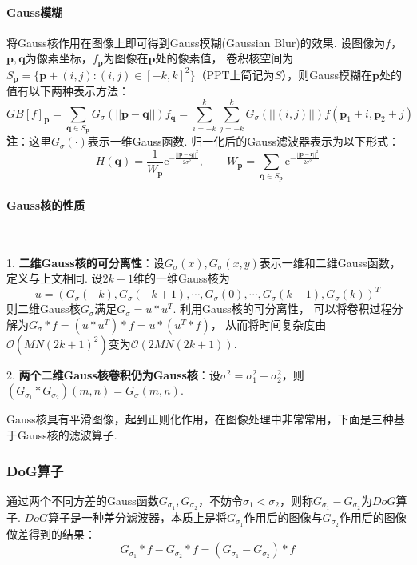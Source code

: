 \documentclass[12pt, a4paper, oneside]{ctexart}
\numberwithin{equation}{section}  %
\theoremstyle{definition}
\def\bd{\boldsymbol}        %
\def\e{\mathrm{e}}          %
\def\O{\mathcal{O}}         %
\def\add{\vspace{1ex}}      %
\begin{document}
\paragraph{Gauss模糊} 将Gauss核作用在图像上即可得到Gauss模糊(Gaussian Blur)的效果. 设图像为$f$，$\bd{p},\bd{q}$为像素坐标，$f_{\bd{p}}$为图像在$\bd{p}$处的像素值，
卷积核空间为$S_{\bd{p}} = \{\bd{p}+(i,j):(i,j)\in[-k,k]^2\}$（PPT上简记为$S$），则Gauss模糊在$\bd{p}$处的值有以下两种表示方法：
\begin{equation*}
    GB[f]_{\bd{p}} = \sum_{\bd{q}\in S_{\bd{p}}}G_\sigma(||\bd{p}-\bd{q}||)f_{\bd{q}}
    = \sum_{i=-k}^k\sum_{j=-k}^kG_\sigma(||(i,j)||)f(\bd{p}_1+i,\bd{p}_2+j)
\end{equation*}
\textbf{注}：这里$G_\sigma(\cdot)$表示一维Gauss函数. 归一化后的Gauss滤波器表示为以下形式：
\begin{equation*}
    H(\bd{q}) = \frac{1}{W_{\bd{p}}}\e^{-\frac{||\bd{p}-\bd{q}||^2}{2\sigma^2}},\qquad W_{\bd{p}} = \sum_{\bd{q}\in S_{\bd{p}}}\e^{-\frac{||\bd{p}-\bd{r}||^2}{2\sigma^2}}
\end{equation*}

\paragraph{Gauss核的性质}\ \par
1. \textbf{二维Gauss核的可分离性}：设$G_\sigma(x),G_\sigma(x,y)$表示一维和二维Gauss函数，定义与上文相同. 设$2k+1$维的一维Gauss核为
\begin{equation*}
    u = (G_\sigma(-k),G_\sigma(-k+1),\cdots,G_\sigma(0),\cdots,G_\sigma(k-1),G_\sigma(k))^T
\end{equation*}
则二维Gauss核$G_\sigma$满足$G_\sigma = u * u^T$. 利用Gauss核的可分离性，
可以将卷积过程分解为$G_\sigma*f = (u * u^T)*f = u * (u^T * f)$，
从而将时间复杂度由$\O(MN(2k+1)^2)$变为$\O(2MN(2k+1))$.\add

2. \textbf{两个二维Gauss核卷积仍为Gauss核}：设$\sigma^2=\sigma_1^2+\sigma_2^2$，则$(G_{\sigma_1}*G_{\sigma_2})(m,n) = G_{\sigma}(m,n)$.

Gauss核具有平滑图像，起到正则化作用，在图像处理中非常常用，下面是三种基于Gauss核的滤波算子.

\subsubsection{DoG算子}
通过两个不同方差的Gauss函数$G_{\sigma_1},G_{\sigma_2}$，不妨令$\sigma_1 < \sigma_2$，则称$G_{\sigma_1} - G_{\sigma_2}$为$DoG$算子. 
$DoG$算子是一种差分滤波器，本质上是将$G_{\sigma_1}$作用后的图像与$G_{\sigma_2}$作用后的图像做差得到的结果：
\begin{equation*}
    G_{\sigma_1} * f - G_{\sigma_2} * f = (G_{\sigma_1} - G_{\sigma_2})*f
\end{equation*}
\end{document}
